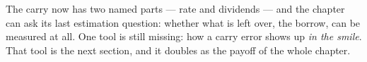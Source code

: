 The carry now has two named parts --- rate and dividends --- and the
chapter can ask its last estimation question: whether what is left
over, the borrow, can be measured at all.  One tool is still missing:
how a carry error shows up \emph{in the smile}.  That tool is the
next section, and it doubles as the payoff of the whole chapter.
